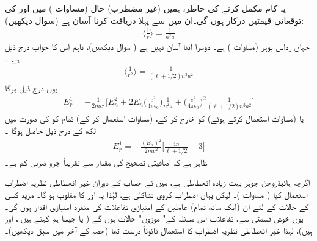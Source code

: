  یہ کام مکمل کرنے کی خاطر،  ہمیں (غیر مضطرب)  حال   (مساوات  )  میں  اور  کی توقعاتی قیمتیں درکار ہوں گی۔ان میں سے   پہلا دریافت کرنا  آسان ہے  (سوال    دیکھیں):
\begin{align}\label{مساوات_غیر_مضطرب_آر_ایک}
\big\langle \frac{1}{r} \big\rangle = \frac{1}{n^2 a}
\end{align}
جہاں  رداس بوہر (مساوات  )  ہے۔  دوسرا اتنا آسان نہیں ہے ( سوال    دیکھیں)،  تاہم اس کا جواب درج ذیل ہے ۔
\begin{align}\label{مساوات_غیر_مضطرب_آر_دوم}
\big\langle \frac{1}{r^2} \big\rangle = \frac{1}{(\ell  + 1/2)n^3 a^2}
\end{align}
یوں درج ذیل ہوگا 
\begin{align*}
E_r^1 = - \frac{1}{2mc^2} \big [ E_n^2 + 2 E_n \big(\frac{e^2}{4 \pi \epsilon_0}\big) \frac{1}{n^2 a} + \big(\frac{e^2}{4 \pi \epsilon_0}\big)^2 \frac{1}{(\ell  + 1/2)n^3 a^2} \big ]
\end{align*}
یا (مساوات    استعمال کرتے ہوئے)   کو خارج  کر کے،   (مساوات  استعمال کر کے)  تمام  کو   کی صورت میں لکھ کے درج ذیل حاصل ہوگا ۔
\begin{align}\label{مساوات_غیر_مضطرب_اضافیتی_تصحیح}
E_r^1 = - \frac{(E_n)^2}{2mc^2} \big [ \frac{4n}{\ell  + 1/2} - 3 \big ]
\end{align}
ظاہر ہے کہ اضافیتی تصحیح کی مقدار  سے تقریباً  جزو ضربی   کم ہے۔

اگرچہ ہائیڈروجن جوہر بہت زیادہ انحطاطی ہے،   میں نے حساب کے دوران غیر انحطاطی نظریہ اضطراب استعمال کیا ( مساوات )۔  لیکن  یہاں  اضطراب کروی تشاکلی ہے،   لہٰذا    یہ  اور  کا مقلوب ہو گا۔  مزید کسی    کے   حالات کے لئے  ان  (ایک ساتھ تمام)   عاملین   کے امتیازی تفاعلات کی  منفرد امتیازی اقدار ہوں گی۔  یوں خوش قسمتی سے،  تفاعلات  اس مسئلہ کے" موزوں"  حالات  ہوں گے (  یا جیسا ہم کہتے ہیں ،  اور   ہیں)،   لہٰذا   غیر انحطاطی نظریہ اضطراب کا استعمال قانوناً   درست تھا  (حصہ  کے آخر میں سبق دیکھیں)۔

